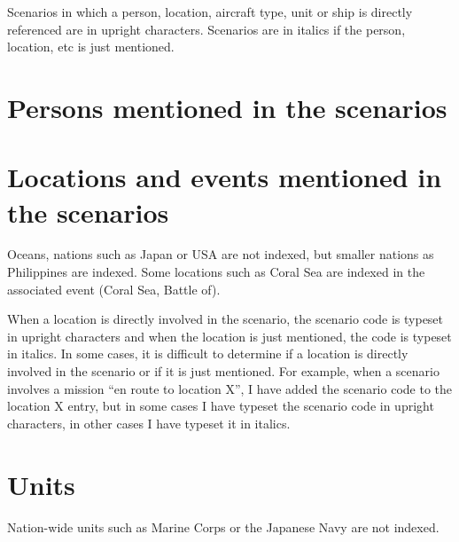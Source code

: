 \documentclass[a4paper,twocolumn]{article}
\begin{document}
Scenarios in which a person, location, aircraft type, unit or ship is
directly referenced are in upright characters. Scenarios are in
italics if the person, location, etc is just mentioned.

\sloppy
\section*{Persons mentioned in the scenarios}

\fussy
\begin{hangparas}{4mm}{1}
\end{hangparas}

\section*{Locations and events mentioned in the scenarios}

Oceans, nations such as Japan or USA are not indexed, but smaller
nations as Philippines are indexed. Some locations such as Coral Sea
are indexed in the associated event (Coral Sea, Battle of).

\vspace{2mm}

When a location is directly involved in the scenario, the scenario
code is typeset in upright characters and when the location is just
mentioned, the code is typeset in italics. In some cases, it is
difficult to determine if a location is directly involved in the
scenario or if it is just mentioned. For example, when a scenario
involves a mission ``en route to location X'', I have added the
scenario code to the location X entry, but in some cases I have
typeset the scenario code in upright characters, in other cases I have
typeset it in italics.

\vspace{2mm}

\begin{hangparas}{4mm}{1}
\end{hangparas}

\section*{Units}

Nation-wide units such as Marine Corps or the Japanese Navy are not indexed.
\sloppy

\vspace{2mm}

\fussy
\begin{hangparas}{4mm}{1}
\end{hangparas}
\end{document}
